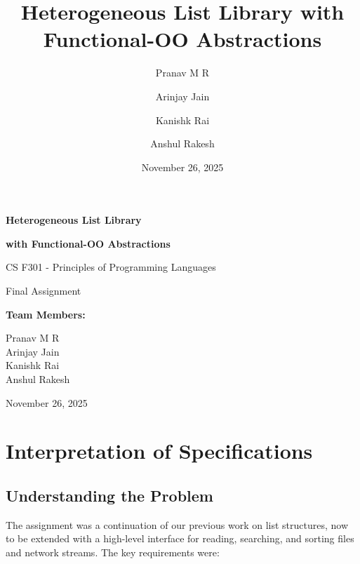 \documentclass[11pt,a4paper]{article}
\title{\textbf{Heterogeneous List Library with Functional-OO Abstractions}}
\author{
    Pranav M R \and
    Arinjay Jain \and
    Kanishk Rai \and
    Anshul Rakesh
}
\date{November 26, 2025}
\begin{document}
\begin{titlepage}
    \centering
    \vspace*{2cm}
    
    {\Huge\bfseries Heterogeneous List Library\par}
    \vspace{0.5cm}
    {\huge\bfseries with Functional-OO Abstractions\par}
    
    \vspace{2cm}
    
    {\Large CS F301 - Principles of Programming Languages\par}
    \vspace{0.5cm}
    {\Large Final Assignment\par}
    
    \vfill
    
    {\large\textbf{Team Members:}\par}
    \vspace{0.5cm}
    {\large
        Pranav M R\\
        Arinjay Jain\\
        Kanishk Rai\\
        Anshul Rakesh\\
    \par}
    
    \vfill
    
    {\large November 26, 2025\par}
    
    \vspace{1cm}
\end{titlepage}

\newpage
\tableofcontents
\newpage

\section{Interpretation of Specifications}

\subsection{Understanding the Problem}

The assignment was a continuation of our previous work on list structures, now to be extended with a high-level interface for reading, searching, and sorting files and network streams. The key requirements were:
\end{document}

